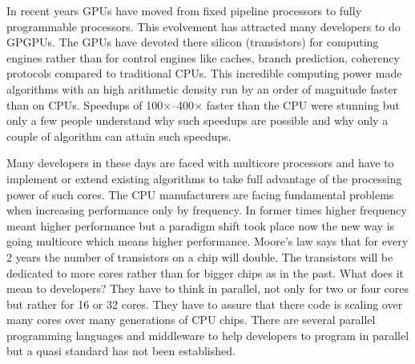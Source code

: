 



In recent years \glspl{GPU} have moved from fixed pipeline processors to fully
programmable processors. This evolvement has attracted many developers to do
\glspl{GPGPU}. The \glspl{GPU} have devoted there silicon (transistors) for
computing engines rather than for control engines like caches, branch
prediction, coherency protocols compared to traditional \glspl{CPU}. This
incredible computing power made algorithms with an high arithmetic density run
by an order of magnitude faster than on \glspl{CPU}. Speedups of 
100$\times$--400$\times$ faster than the \gls{CPU} were stunning but only a few
people understand why such speedups are possible and why only a couple of
algorithm can attain such speedups.


Many developers in these days are faced with multicore processors and have to
implement or extend existing algorithms to take full advantage of the processing
power of such cores. The \gls{CPU} manufacturers are facing fundamental problems
when increasing performance only by frequency. In former times higher frequency
meant higher performance but a paradigm shift took place now the new way is
going multicore which means higher performance. Moore's law says that for every
2 years the number of transistors on a chip will double. The transistors will be
dedicated to more cores rather than for bigger chips as in the past. What does
it mean to developers? They have to think in parallel, not only for two or four
cores but rather for 16 or 32 cores. They have to assure that there code is
scaling over many cores over many generations of \gls{CPU} chips. There are
several parallel programming languages and middleware to help developers to
program in parallel but a quasi standard has not been established. 

